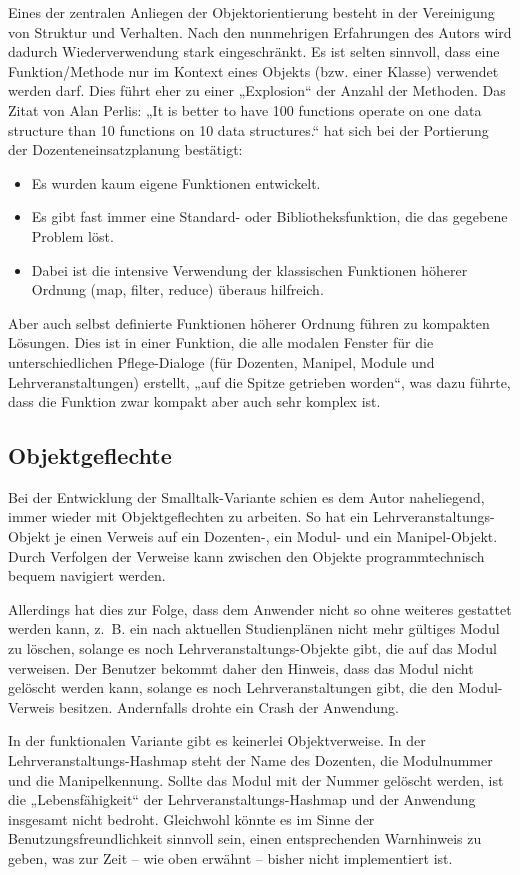 \documentclass[11pt]{article}
\begin{document}
Eines der zentralen Anliegen der Objektorientierung besteht in der
Vereinigung von Struktur und Verhalten. Nach den nunmehrigen
Erfahrungen des Autors wird dadurch Wiederverwendung stark
eingeschränkt. Es ist selten sinnvoll, dass eine Funktion/Methode nur
im Kontext eines Objekts (bzw. einer Klasse) verwendet werden
darf. Dies führt eher zu einer „Explosion“ der Anzahl der
Methoden. Das Zitat von Alan Perlis: „It is better to have 100
functions operate on one data structure than 10 functions on 10 data
structures.“ hat sich bei der Portierung der Dozenteneinsatzplanung bestätigt:
\begin{itemize}
\item Es wurden kaum eigene Funktionen entwickelt.
\item Es gibt fast immer eine Standard- oder Bibliotheksfunktion, die das
gegebene Problem löst.
\item Dabei ist die intensive Verwendung der klassischen Funktionen
höherer Ordnung (map, filter, reduce) überaus hilfreich.
\end{itemize}
Aber auch selbst definierte Funktionen höherer Ordnung führen zu kompakten
Lösungen. Dies ist in einer Funktion, die alle modalen Fenster für die
unterschiedlichen Pflege-Dialoge (für Dozenten, Manipel, Module und
Lehrveranstaltungen) erstellt, „auf die Spitze getrieben worden“, was
dazu führte, dass die Funktion zwar kompakt aber auch sehr komplex
ist.
\subsection*{Objektgeflechte}
\label{sec:org220f75f}
Bei der Entwicklung der Smalltalk-Variante schien es dem Autor
naheliegend, immer wieder mit Objektgeflechten zu arbeiten. So hat ein
Lehrveranstaltungs-Objekt je einen Verweis auf ein Dozenten-, ein
Modul- und ein Manipel-Objekt. Durch Verfolgen der Verweise kann
zwischen den Objekte programmtechnisch bequem navigiert werden.

Allerdings hat dies zur Folge, dass dem Anwender nicht so ohne
weiteres gestattet werden kann, z.~B. ein nach aktuellen
Studienplänen nicht mehr gültiges Modul zu löschen, solange es noch
Lehrveranstaltungs-Objekte gibt, die auf das Modul verweisen. Der
Benutzer bekommt daher den Hinweis, dass das Modul nicht gelöscht werden
kann, solange es noch Lehrveranstaltungen gibt, die den Modul-Verweis
besitzen. Andernfalls drohte ein Crash der Anwendung.

In der funktionalen Variante gibt es keinerlei Objektverweise. In der
Lehrveranstaltungs-Hashmap steht der Name des Dozenten, die
Modulnummer und die Manipelkennung. Sollte das Modul mit der Nummer
gelöscht werden, ist die „Lebensfähigkeit“ der
Lehrveranstaltungs-Hashmap und der Anwendung insgesamt nicht
bedroht. Gleichwohl könnte es im Sinne der Benutzungsfreundlichkeit
sinnvoll sein, einen entsprechenden Warnhinweis zu geben, was zur
Zeit -- wie oben erwähnt -- bisher nicht implementiert ist.
\end{document}
